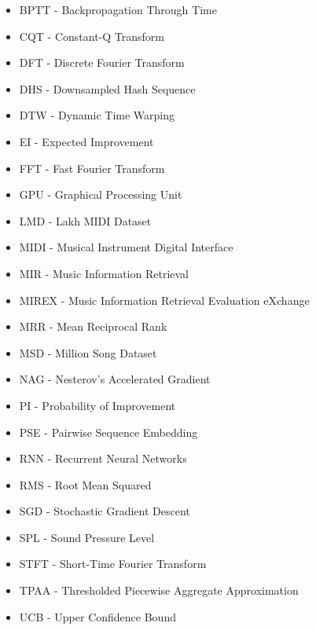 \begin{itemize}

\item BPTT - Backpropagation Through Time

\item CQT - Constant-Q Transform

\item DFT - Discrete Fourier Transform

\item DHS - Downsampled Hash Sequence

\item DTW - Dynamic Time Warping

\item EI - Expected Improvement

\item FFT - Fast Fourier Transform

\item GPU - Graphical Processing Unit

\item LMD - Lakh MIDI Dataset

\item MIDI - Musical Instrument Digital Interface

\item MIR - Music Information Retrieval

\item MIREX - Music Information Retrieval Evaluation eXchange

\item MRR - Mean Reciprocal Rank

\item MSD - Million Song Dataset

\item NAG - Nesterov's Accelerated Gradient

\item PI - Probability of Improvement

\item PSE - Pairwise Sequence Embedding

\item RNN - Recurrent Neural Networks

\item RMS - Root Mean Squared

\item SGD - Stochastic Gradient Descent

\item SPL - Sound Pressure Level

\item STFT - Short-Time Fourier Transform

\item TPAA - Thresholded Piecewise Aggregate Approximation

\item UCB - Upper Confidence Bound

\end{itemize}
